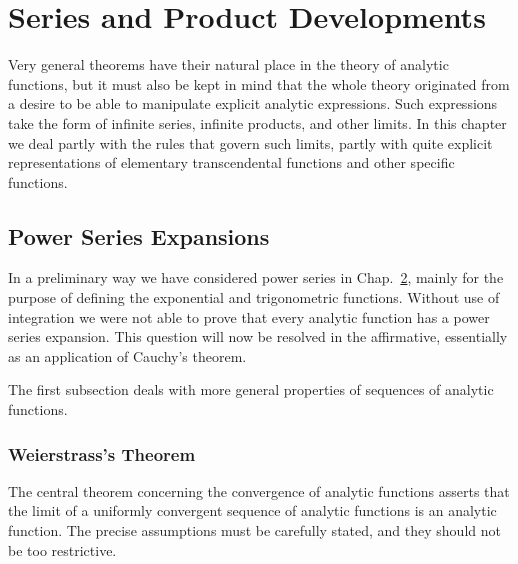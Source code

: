 \chapter{Series and Product Developments}\label{chap:5}

Very general theorems have their natural place in the theory of analytic functions, but it must also be kept in mind that the whole theory originated from a desire to be able to manipulate explicit analytic expressions. Such expressions take the form of infinite series, infinite products, and other limits. In this chapter we deal partly with the rules that govern such limits, partly with quite explicit representations of elementary transcendental functions and other specific functions.

\setcounter{section}{0}\section{Power Series Expansions}\label{sec:5.1}
In a preliminary way we have considered power series in Chap.~\hyperref[chap:2]{2}, mainly for the purpose of defining the exponential and trigonometric functions. Without use of integration we were not able to prove that every analytic function has a power series expansion. This question will now be resolved in the affirmative, essentially as an application of Cauchy's theorem.

The first subsection deals with more general properties of sequences of analytic functions.

\setcounter{section}{1}\setcounter{subsection}{0}\subsection{Weierstrass's Theorem}\label{sec:5.1.1}
The central theorem concerning the convergence of analytic functions asserts that the limit of a uniformly convergent sequence of analytic functions is an analytic function. The precise assumptions must be carefully stated, and they should not be too restrictive.


